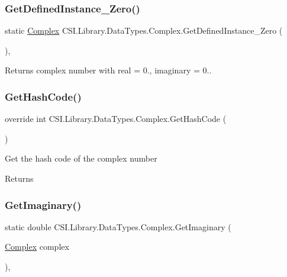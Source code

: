 \subsubsection{\texorpdfstring{GetDefinedInstance\_Zero()}{GetDefinedInstance\_Zero()}}
{\footnotesize\ttfamily static \mbox{\hyperlink{struct_c_s_i_1_1_library_1_1_data_types_1_1_complex}{Complex}} C\+S\+I.\+Library.\+Data\+Types.\+Complex.\+Get\+Defined\+Instance\+\_\+\+Zero (\begin{DoxyParamCaption}{ }\end{DoxyParamCaption})\hspace{0.3cm}{\ttfamily [inline]}, {\ttfamily [static]}}



Returns complex number with real = 0., imaginary = 0.. 

\mbox{\label{struct_c_s_i_1_1_library_1_1_data_types_1_1_complex_a47a48abff04a9b80fedb13868086c298}} 
\subsubsection{\texorpdfstring{GetHashCode()}{GetHashCode()}}
{\footnotesize\ttfamily override int C\+S\+I.\+Library.\+Data\+Types.\+Complex.\+Get\+Hash\+Code (\begin{DoxyParamCaption}{ }\end{DoxyParamCaption})\hspace{0.3cm}{\ttfamily [inline]}}



Get the hash code of the complex number 

\begin{DoxyReturn}{Returns}

\end{DoxyReturn}
\mbox{\label{struct_c_s_i_1_1_library_1_1_data_types_1_1_complex_a2abb82ed6e63bcaf14d937d9a8d2abc1}} 
\subsubsection{\texorpdfstring{GetImaginary()}{GetImaginary()}}
{\footnotesize\ttfamily static double C\+S\+I.\+Library.\+Data\+Types.\+Complex.\+Get\+Imaginary (\begin{DoxyParamCaption}\item[{\mbox{\hyperlink{struct_c_s_i_1_1_library_1_1_data_types_1_1_complex}{Complex}}}]{complex }\end{DoxyParamCaption})\hspace{0.3cm}{\ttfamily [inline]}, {\ttfamily [static]}}



